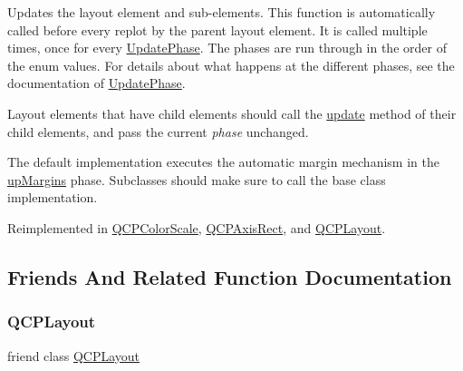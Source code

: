 Updates the layout element and sub-\/elements. This function is automatically called before every replot by the parent layout element. It is called multiple times, once for every \mbox{\hyperlink{class_q_c_p_layout_element_a0d83360e05735735aaf6d7983c56374d}{Update\+Phase}}. The phases are run through in the order of the enum values. For details about what happens at the different phases, see the documentation of \mbox{\hyperlink{class_q_c_p_layout_element_a0d83360e05735735aaf6d7983c56374d}{Update\+Phase}}.

Layout elements that have child elements should call the \mbox{\hyperlink{class_q_c_p_layout_element_a929c2ec62e0e0e1d8418eaa802e2af9b}{update}} method of their child elements, and pass the current {\itshape phase} unchanged.

The default implementation executes the automatic margin mechanism in the \mbox{\hyperlink{class_q_c_p_layout_element_a0d83360e05735735aaf6d7983c56374da288cb59a92280e47261a341f2813e676}{up\+Margins}} phase. Subclasses should make sure to call the base class implementation. 

Reimplemented in \mbox{\hyperlink{class_q_c_p_color_scale_a259dcb6d3053a2cc3c197e9b1191ddbe}{Q\+C\+P\+Color\+Scale}}, \mbox{\hyperlink{class_q_c_p_axis_rect_add049d464b9ef2ccdc638adc4ccb4aca}{Q\+C\+P\+Axis\+Rect}}, and \mbox{\hyperlink{class_q_c_p_layout_a48ecc9c98ea90b547c3e27a931a8f7bd}{Q\+C\+P\+Layout}}.



\subsection{Friends And Related Function Documentation}
\mbox{\label{class_q_c_p_layout_element_a588aac0a0d721f6c5f10126d8596a20f}} 
\subsubsection{\texorpdfstring{QCPLayout}{QCPLayout}}
{\footnotesize\ttfamily friend class \mbox{\hyperlink{class_q_c_p_layout}{Q\+C\+P\+Layout}}\hspace{0.3cm}{\ttfamily [friend]}}

\mbox{\label{class_q_c_p_layout_element_ad077a686e85ab6fa03dcb2fd37fc499a}} 
